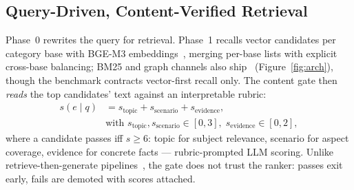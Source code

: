 \subsection{Query-Driven, Content-Verified Retrieval}
\label{sec:retrieval}

Phase~0 rewrites the query for retrieval. Phase~1 recalls vector candidates per
category base with BGE-M3 embeddings~\cite{bge-m3,dpr}, merging per-base
lists with explicit cross-base balancing; BM25 and graph
channels also ship~\cite{bm25} (Figure~\ref{fig:arch}), though the benchmark
contracts vector-first recall only. The content gate
then \emph{reads} the top candidates' text against an interpretable rubric:
\begin{equation}
\begin{split}
s(e \mid q) &= s_{\text{topic}} + s_{\text{scenario}} + s_{\text{evidence}},\\
&\text{with } s_{\text{topic}}, s_{\text{scenario}} \in [0,3],\;
 s_{\text{evidence}} \in [0,2],
\end{split}
\end{equation}
where a candidate passes iff $s \ge 6$: topic for subject relevance, scenario
for aspect coverage, evidence for concrete facts --- rubric-prompted LLM
scoring. Unlike retrieve-then-generate pipelines~\cite{rag-lewis}, the gate
does not trust the ranker: passes exit early, fails are demoted with scores
attached.

